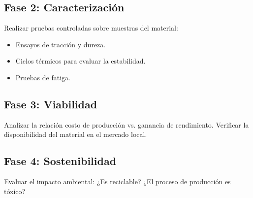 \documentclass[../main]{subfiles}
\begin{document}
\subsection{Fase 2: Caracterización}
Realizar pruebas controladas sobre muestras del material:
\begin{itemize}
  \item Ensayos de tracción y dureza.
  \item Ciclos térmicos para evaluar la estabilidad.
  \item Pruebas de fatiga.
\end{itemize}

\subsection{Fase 3: Viabilidad}
Analizar la relación costo de producción vs. ganancia de rendimiento. Verificar la disponibilidad del material en el mercado local.

\subsection{Fase 4: Sostenibilidad}
Evaluar el impacto ambiental: ¿Es reciclable? ¿El proceso de producción es tóxico?
\end{document}
